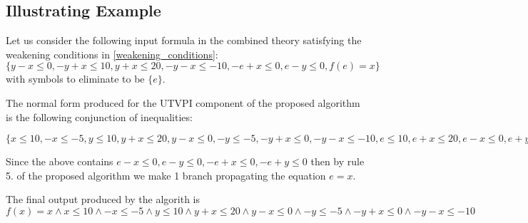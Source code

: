 \subsection{Illustrating 
Example}

Let us consider the following input formula in the
combined theory satisfying the weakening conditions in 
\ref{weakening_conditions}: $\{y - x \leq 0 , -y + x \leq 10,
y + x \leq 20, -y - x \leq -10, -e + x \leq 0, e - y \leq 0, f(e) = x\}$ with symbols to eliminate to be $\{e\}$.

The normal form produced for the UTVPI component of the
proposed algorithm is the following
conjunction of inequalities:

$\{
  x \leq 10,
  -x \leq -5,
  y \leq 10,
  y + x \leq 20,
  y - x \leq 0,
  -y \leq -5,
  -y + x \leq 0,
  -y - x \leq -10,
  e \leq 10,
  e + x \leq 20,
  e - x \leq 0,
  e + y \leq 20,
  e - y \leq 0,
  -e \leq -5,
  -e + x \leq 0,
  -e - x\leq -10,
  -e + y \leq 0,
  -e - y \leq -10
  \}$


Since the above contains $e - x \leq 0, e - y \leq 0, -e + x \leq 0, -e + y \leq 0$ 
then by rule 5. of the proposed algorithm we make 1
branch propagating the equation $e = x$.

The final output produced by the algorith is 
$f(x) = x \land x \leq 10
\land -x \leq -5 
\land y \leq 10 
\land y + x \leq 20
\land y - x \leq 0
\land -y \leq -5
\land -y + x \leq 0
\land -y - x \leq -10$



